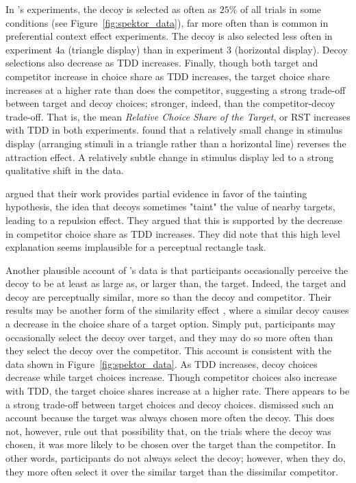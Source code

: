 In \textcite{spektorWhenGoodLooks2018b}'s experiments, the decoy is selected as often as $25\%$ of all trials in some conditions (see Figure~\ref{fig:spektor_data}), far more often than is common in preferential context effect experiments. The decoy is also selected less often in experiment 4a (triangle display) than in experiment 3 (horizontal display). Decoy selections also decrease as TDD increases. Finally, though both target and competitor increase in choice share as TDD increases, the target choice share increases at a higher rate than does the competitor, suggesting a strong trade-off between target and decoy choices; stronger, indeed, than the competitor-decoy trade-off. That is, the mean \textit{Relative Choice Share of the Target}, or RST \parencite{berkowitschRigorouslyTestingMultialternative2014b} increases with TDD in both experiments. \textcite{spektorWhenGoodLooks2018b} found that a relatively small change in stimulus display (arranging stimuli in a triangle rather than a horizontal line) reverses the attraction effect. A relatively subtle change in stimulus display led to a strong qualitative shift in the data. 

\textcite{spektorWhenGoodLooks2018b} argued that their work provides partial evidence in favor of the tainting hypothesis, the idea that decoys sometimes "taint" the value of nearby targets, leading to a repulsion effect. They argued that this is supported by the decrease in competitor choice share as TDD increases. They did note that this high level explanation seems implausible for a perceptual rectangle task.

Another plausible account of \textcite{spektorWhenGoodLooks2018b}'s data is that participants occasionally perceive the decoy to be at least as large as, or larger than, the target. Indeed, the target and decoy are perceptually similar, more so than the decoy and competitor. Their results may be another form of the similarity effect \parencite{tverskyEliminationAspectsTheory1972}, where a similar decoy causes a decrease in the choice share of a target option. Simply put, participants may occasionally select the decoy over target, and they may do so more often than they select the decoy over the competitor. This account is consistent with the data shown in Figure~\ref{fig:spektor_data}. As TDD increases, decoy choices decrease while target choices increase. Though competitor choices also increase with TDD, the target choice shares increase at a higher rate. There appears to be a strong trade-off between target choices and decoy choices. \textcite{spektorWhenGoodLooks2018b} dismissed such an account because the target was always chosen more often the decoy. This does not, however, rule out that possibility that, on the trials where the decoy was chosen, it was more likely to be chosen over the target than the competitor. In other words, participants do not always select the decoy; however, when they do, they more often select it over the similar target than the dissimilar competitor. 

